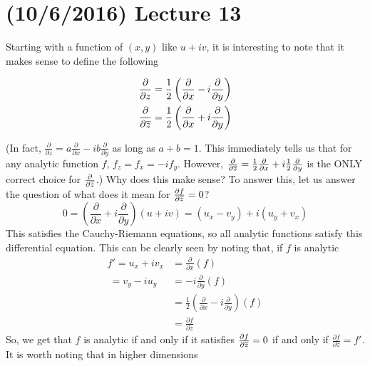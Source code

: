 \documentclass[11pt,leqno,oneside]{amsart}
\numberwithin{thm}{section}
\begin{document}
\section{(10/6/2016) Lecture 13}
  Starting with a function of $(x,y)$ like $u+iv$, it is interesting
  to note that it makes sense to define the following
  \begin{defn}
    \begin{align*}
      \frac{\partial}{\partial z} & = \frac{1}{2}
                                    \left(
                                    \frac{\partial}{\partial x} -
                                    i\frac{\partial}{\partial y}
                                    \right) \\
      \frac{\partial}{\partial \overline{z}} & = \frac{1}{2}
                                         \left(
                                         \frac{\partial}{\partial x} +
                                         i\frac{\partial}{\partial y}
                                         \right)
    \end{align*}
  \end{defn}
  (In fact, $\frac{\partial}{\partial z} = a \frac{\partial}{\partial x} - i b \frac{\partial}{\partial y}$ as long as $a + b = 1$.  This immediately tells us that for any analytic function $f$, $f_z = f_x = -i f_y$.  However, $\frac{\partial}{\partial \overline{z}} = \frac12 \frac{\partial}{\partial x} + i \frac12 \frac{\partial}{\partial y}$ is the ONLY correct choice for $\frac{\partial}{\partial \overline{z}}$.)
  Why does this make sense? To answer this, let us answer the question
  of what does it mean for $\frac{\partial f}{\partial \overline{z}} =
  0$? \[
    0 =
    \left(
      \frac{\partial}{\partial x} + i\frac{\partial}{\partial y}
    \right)(u+iv) = (u_x-v_y)+i(u_y+v_x)
  \]
  This satisfies the Cauchy-Riemann equations, so all analytic
  functions satisfy this differential equation. This can be clearly
  seen by noting that, if $f$ is analytic
  \begin{align*}
    f' = u_x+iv_x & = \frac{\partial}{\partial x}(f) \\
    ~ = v_y-iu_y & = -i\frac{\partial}{\partial y}(f)\\
     \ & = \frac{1}{2}
            \left(
            \frac{\partial}{\partial x}-i\frac{\partial}{\partial y}
            \right)(f) \\
     \ & = \frac{\partial f}{\partial z}
  \end{align*}
  So, we get that $f$ is analytic if and only if it satisfies
  $\frac{\partial f}{\partial \overline{z}} = 0$ if and only if $\frac{\partial
    f}{\partial z} = f'$. It is worth noting that in higher dimensions
\end{document}
